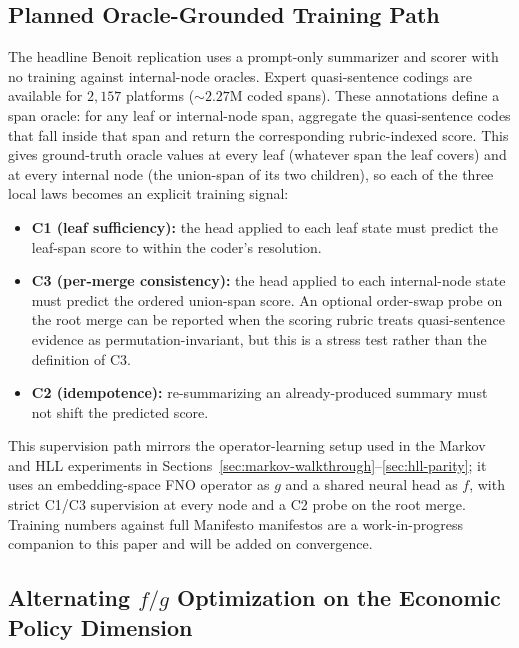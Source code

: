\subsection{Planned Oracle-Grounded Training Path}

The headline Benoit replication uses a prompt-only summarizer and
scorer with no training against internal-node oracles. Expert
quasi-sentence codings are available for $2{,}157$ platforms
($\sim\!2.27$M coded spans). These annotations define a span oracle:
for any leaf or internal-node span, aggregate the quasi-sentence codes
that fall inside that span and return the corresponding rubric-indexed
score. This gives ground-truth oracle values at every leaf (whatever
span the leaf covers) and at every internal node (the union-span of its
two children), so each of the three local laws becomes an explicit
training signal:

\begin{itemize}[leftmargin=1.5em]
    \item \textbf{C1 (leaf sufficiency):} the head applied to each
          leaf state must predict the leaf-span score to within the
          coder's resolution.
    \item \textbf{C3 (per-merge consistency):} the head applied to each
          internal-node state must predict the ordered union-span score.
          An optional order-swap probe on the root merge can be reported
          when the scoring rubric treats quasi-sentence evidence as
          permutation-invariant, but this is a stress test rather than
          the definition of C3.
    \item \textbf{C2 (idempotence):} re-summarizing an already-produced
          summary must not shift the predicted score.
\end{itemize}

This supervision path mirrors the operator-learning setup used in the
Markov and HLL experiments in
Sections~\ref{sec:markov-walkthrough}--\ref{sec:hll-parity}; it uses
an embedding-space FNO operator as $g$ and a shared neural head as
$f$, with strict C1/C3 supervision at every node and a C2 probe on
the root merge. Training numbers against full Manifesto manifestos are
a work-in-progress companion to this paper and will be added on
convergence.

\subsection[Alternating f/g Optimization on the Economic Policy Dimension]{Alternating $f/g$ Optimization on the Economic Policy
Dimension}\label{app:rile-fg-ladder}

